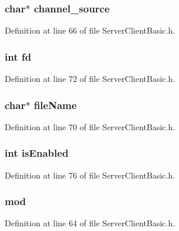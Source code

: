 \subsubsection[{channel\+\_\+source}]{\setlength{\rightskip}{0pt plus 5cm}char$\ast$ channel\+\_\+source}\label{structchannel_a0a72aa1c901810c34da12df46f40041e}


Definition at line 66 of file Server\+Client\+Basic.\+h.

\subsubsection[{fd}]{\setlength{\rightskip}{0pt plus 5cm}int fd}\label{structchannel_a6f8059414f0228f0256115e024eeed4b}


Definition at line 72 of file Server\+Client\+Basic.\+h.

\subsubsection[{file\+Name}]{\setlength{\rightskip}{0pt plus 5cm}char$\ast$ file\+Name}\label{structchannel_a25c8761bc1f523fe6a53db546ae83add}


Definition at line 70 of file Server\+Client\+Basic.\+h.

\subsubsection[{is\+Enabled}]{\setlength{\rightskip}{0pt plus 5cm}int is\+Enabled}\label{structchannel_a5c56d01677044a9e8009acf457aa1a37}


Definition at line 76 of file Server\+Client\+Basic.\+h.

\subsubsection[{mod}]{ mod}\label{structchannel_a7ea0baa03c86607926d24b321e7b4b40}


Definition at line 64 of file Server\+Client\+Basic.\+h.

